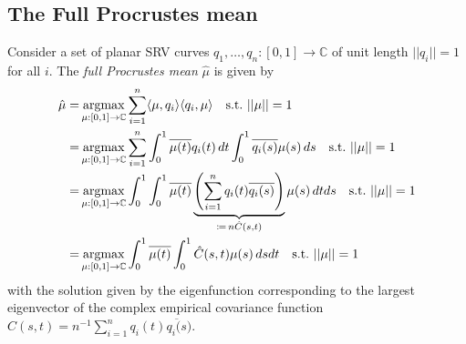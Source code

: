 \subsection{The Full Procrustes mean}
Consider a set of planar SRV curves $q_1,\dots,q_n : [0,1] \rightarrow \mathbb{C}$ of unit length $||q_i|| = 1$ for all $i$.
The \textit{full Procrustes mean} $\hat{\mu}$ is given by
\begin{align*}
    \hat{\mu} =& \operatorname*{argmax}_{\mu:[0,1]\rightarrow\mathbb{C}} \sum_{i=1}^n \langle \mu, q_i \rangle \langle q_i, \mu \rangle
    \quad\text{s.t.}\,\, ||\mu|| = 1 \\
    =& \operatorname*{argmax}_{\mu:[0,1]\rightarrow\mathbb{C}} \sum_{i=1}^n
    \int_0^1 \overline{\mu(t)} q_i(t) \, dt \int_0^1 \overline{q_i(s)} \mu(s) \, ds
    \quad\text{s.t.}\,\, ||\mu|| = 1 \\
    =& \operatorname*{argmax}_{\mu:[0,1]\rightarrow\mathbb{C}}  \int_0^1 \int_0^1
    \overline{\mu(t)} \underbrace{\left( \sum_{i=1}^n q_i(t) \overline{q_i(s)} \right)}_{\coloneqq \, n \hat{C}(s,t)} \mu(s) \, dt ds
    \quad\text{s.t.}\,\, ||\mu|| = 1 \\
    =& \operatorname*{argmax}_{\mu:[0,1]\rightarrow\mathbb{C}} \int_0^1
    \overline{\mu(t)} \int_0^1 \hat{C}(s,t) \mu(s) \, ds dt
    \quad\text{s.t.}\,\, ||\mu|| = 1
\end{align*}
with the solution given by the eigenfunction corresponding to the largest eigenvector of the complex empirical covariance function $\hat{C}(s,t) = n^{-1} \sum_{i=1}^n q_i(t) \overline{q_i(s})$.

\newpage
